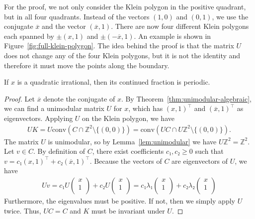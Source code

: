 For the proof, we not only consider the Klein polygon in the positive quadrant,
but in all four quadrants.
Instead of the vectors $(1, 0)$ and $(0, 1)$, we use the conjugate
$\overline{x}$ and the vector $(\overline{x}, 1)$.
There are now four different Klein polygons each spanned by $±(x, 1)$
and $±(-\overline{x}, 1)$.
An example is shown in Figure~\ref{fig:full-klein-polygon}.
The idea behind the proof is that the matrix $U$ does not change any of the four
Klein polygons, but it is not the identity and therefore it must move the
points along the boundary.

\begin{theorem}
  If $x$ is a quadratic irrational,
  then its continued fraction is periodic.
\end{theorem}

\begin{proof}
  Let $\overline{x}$ denote the conjugate of $x$.
  By Theorem~\ref{thm:unimodular-algebraic}, we can find a unimodular matrix $U$ for $x$,
  which has $(x, 1)^⊤$ and $(\overline{x}, 1)^⊤$ as eigenvectors.
  Applying $U$ on the Klein polygon, we have
  \begin{align*}
    UK
    = U \mathrm{conv}(C ∩ ℤ^2 \setminus \{(0, 0)\})
    = \mathrm{conv}(UC ∩ Uℤ^2 \setminus \{(0, 0)\}).
  \end{align*}
  The matrix $U$ is unimodular, so by Lemma~\ref{lem:unimodular} we have $Uℤ^2 = ℤ^2$.
  Let $v ∈ C$.
  By definition of $C$,
  there exist coefficients $c₁, c₂ ≥ 0$ such that $v = c₁ (x, 1)^⊤ + c₂ (\overline{x}, 1)^⊤$.
  Because the vectors of $C$ are eigenvectors of $U$, we have
  \begin{align*}
    U v
    = c₁
    U\begin{pmatrix}
      x \\
      1 \\
    \end{pmatrix}
    +
    c₂ U\begin{pmatrix}
      x \\
      1 \\
    \end{pmatrix}
    = c₁ λ₁ \begin{pmatrix}
      x \\
      1 \\
    \end{pmatrix}
    + c₂ λ₂ \begin{pmatrix}
      x \\
      1 \\
    \end{pmatrix}
  \end{align*}
  Furthermore, the eigenvalues must be positive.
  If not, then we simply apply $U$ twice.
  Thus, $UC = C$ and $K$ must be invariant under $U$.


\end{proof}
